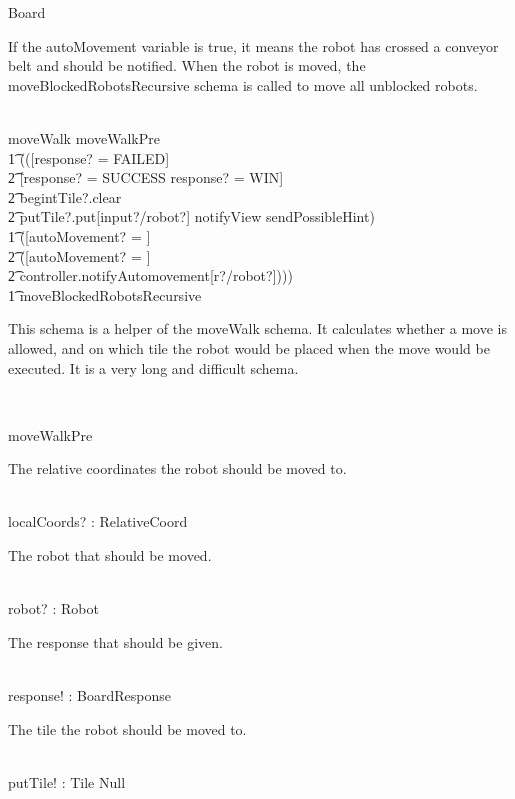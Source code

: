 \documentclass[12pt]{article}
\begin{document}
\begin{class}{Board}
\begin{zpar}
If the autoMovement variable is true, it means the robot has crossed a conveyor belt and should be notified. When the robot is moved, the moveBlockedRobotsRecursive schema is called to move all unblocked robots.
\end{zpar} \\
moveWalk \sdef moveWalkPre \; \; \comp \\ \t1 (([response? = FAILED] \; \; [] \\ \t2 [response? = SUCCESS \vee response? = WIN] \;\; \wedge \\ \t2 begintTile?.clear \; \; \wedge \\ \t2 putTile?.put[input?/robot?] \wedge notifyView \wedge sendPossibleHint) \; \; \wedge \\ \t1 ([autoMovement? = \false] \; \; [] \\ \t2 ([autoMovement? = \true] \; \; \wedge \\ \t2 controller.notifyAutomovement[r?/robot?]))) \; \; \comp \\ \t1
moveBlockedRobotsRecursive \\
\begin{zpar}
This schema is a helper of the moveWalk schema. It calculates whether a move is allowed, and on which tile the robot would be placed when the move would be executed. It is a very long and difficult schema.
\end{zpar} \\
\begin{nobottomschema}{moveWalkPre}
\begin{zpar}
The relative coordinates the robot should be moved to.
\end{zpar} \\
localCoords? : RelativeCoord \\
\begin{zpar}
The robot that should be moved.
\end{zpar} \\
robot? : Robot \\
\begin{zpar}
The response that should be given.
\end{zpar} \\
response! : BoardResponse \\
\begin{zpar}
The tile the robot should be moved to.
\end{zpar} \\
putTile! : Tile \cup Null \\
\begin{zpar}

\end{zpar}
\end{nobottomschema}
\end{class}
\end{document}
